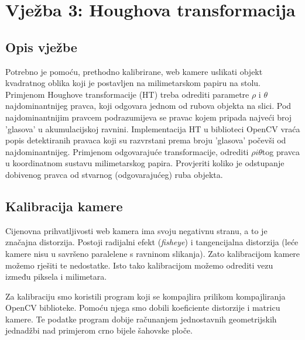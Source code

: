 \section{Vježba 3: Houghova transformacija}

\subsection{Opis vježbe}
Potrebno je pomoću, prethodno kalibrirane, web kamere uslikati objekt
kvadratnog oblika koji je postavljen na milimetarskom papiru na stolu.
Primjenom Houghove transformacije (HT) treba odrediti parametre \(\rho
\) i \( \theta \)najdominantnijeg pravca, koji odgovara jednom od rubova objekta
na slici. Pod najdominantnijim pravcem podrazumijeva se pravac kojem
pripada najveći broj 'glasova' u akumulacijskoj ravnini. Implementacija
HT u biblioteci OpenCV vraća popis detektiranih pravaca koji su
razvrstani prema broju 'glasova' počevši od najdominantnijeg. Primjenom
odgovarajuće transformacije, odrediti \(\rho i \theta \)tog pravca u
koordinatnom sustavu milimetarskog papira. Provjeriti koliko je
odstupanje dobivenog pravca od stvarnog (odgovarajućeg) ruba objekta.

\subsection{Kalibracija kamere}
Cijenovna prihvatljivosti web kamera ima svoju negativnu stranu, a to je
značajna distorzija. Postoji radijalni efekt (\textit{fisheye}) i
tangencijalna distorzija (leće kamere nisu u savršeno paralelene s
ravninom slikanja). Zato kalibracijom kamere možemo rješiti te
nedostatke. Isto tako kalibracijom možemo odrediti vezu između piksela i
milimetara.

Za kalibraciju smo koristili program koji se kompajlira prilikom
kompajliranja OpenCV biblioteke. Pomoću njega smo dobili koeficiente
distorzije i matricu kamere. Te podatke program dobije računanjem
jednostavnih geometrijskih jednadžbi nad primjerom crno bijele šahovske ploče.

